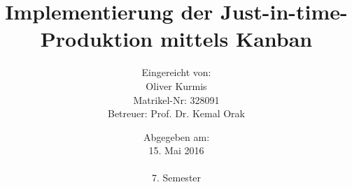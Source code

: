 
\begin{titlepage}
\titlehead{\large FOM Hochschule für Oekonomie \& Management Essen\\ 
Standort München\\
\normalsize Berufsbegleitender Studiengang zum B.Sc.\ Wirtschaftsinformatik}
\subject{\vspace{1cm}Seminararbeit}
\title{Implementierung der Just-in-time-Produktion mittels Kanban}
\author{
 {\normalsize Eingereicht von:}
   \\Oliver Kurmis\\
  {\normalsize Matrikel-Nr: 328091}\\
  {\normalsize Betreuer: Prof. Dr. Kemal Orak}
}
\date{{\normalsize Abgegeben am:}\\15. Mai 2016\\\\7. Semester}

\end{titlepage}

\maketitle 

\thispagestyle{empty}
